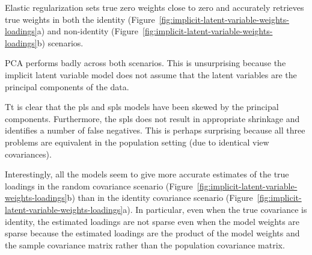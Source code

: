 Elastic regularization sets true zero weights close to zero and accurately retrieves true weights in both the identity (Figure~\ref{fig:implicit-latent-variable-weights-loadings}a) and non-identity (Figure~\ref{fig:implicit-latent-variable-weights-loadings}b) scenarios.

PCA performs badly across both scenarios. This is unsurprising because the implicit latent variable model does not assume that the latent variables are the principal components of the data.

Tt is clear that the \acrshort{pls} and \acrshort{spls} models have been skewed by the principal components.
Furthermore, the \acrshort{spls} does not result in appropriate shrinkage and identifies a number of false negatives.
This is perhaps surprising because all three problems are equivalent in the population setting (due to identical view covariances).

Interestingly, all the models seem to give more accurate estimates of the true loadings in the random covariance scenario (Figure~\ref{fig:implicit-latent-variable-weights-loadings}b) than in the identity covariance scenario (Figure~\ref{fig:implicit-latent-variable-weights-loadings}a).
In particular, even when the true covariance is identity, the estimated loadings are not sparse even when the model weights are sparse because the estimated loadings are the product of the model weights and the sample covariance matrix rather than the population covariance matrix.


